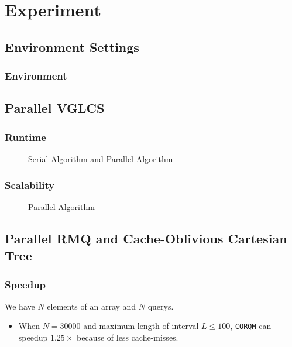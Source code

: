 \section{Experiment}

\subsection{Environment Settings}
\begin{frame}
    \frametitle{Environment}
\end{frame}

\subsection{Parallel VGLCS}
\begin{frame}
	\frametitle{Runtime}
	\begin{figure}[!ht]
		\centering
		\subfigure[Runtime]{
			
			\label{fig:fig-parallel}
		}
		\caption{Serial Algorithm and Parallel Algorithm}
		\label{fig:light_weight}
	\end{figure}
\end{frame}

\begin{frame}
	\frametitle{Scalability}
	\begin{figure}[!ht]
		\centering
		\subfigure[Scalability]{
			
			\label{fig:fig-parallel}
		}
		\caption{Parallel Algorithm}
		\label{fig:light_weight}
	\end{figure}
\end{frame}

\subsection{Parallel RMQ and Cache-Oblivious Cartesian Tree}
\begin{frame}
	\frametitle{Speedup}
	We have $N$ elements of an array and $N$ querys.
	\begin{itemize}
		\setlength\itemsep{1em}
		\item When $N = 30000$ and maximum length of interval $L \le 100$, \texttt{CORQM} can speedup $1.25\times$ 
		because of less cache-misses.
	\end{itemize}
\end{frame}